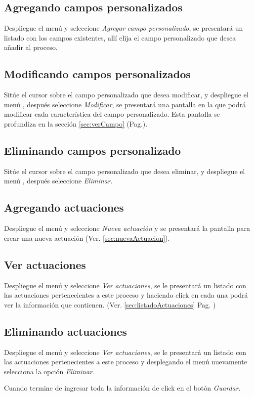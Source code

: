 \subsection{Agregando campos personalizados}
\label{sec:agregarCamposProceso}
Despliegue el men\'u \blackberry y seleccione \emph{Agregar campo personalizado}, se
presentar\'a un listado con los campos existentes, all\'i elija el campo
personalizado que desea a\~nadir al proceso.

\subsection{Modificando campos personalizados}
\label{sec:modificarCamposProceso}
Sit\'ue el cursor sobre el campo personalizado que desea modificar, y despliegue el
men\'u \blackberry, despu\'es seleccione \emph{Modificar},
se presentar\'a una pantalla en la que podr\'a modificar cada caracter\'istica
del campo personalizado. Esta pantalla se profundiza en la secci\'on
\ref{sec:verCampo} (Pag.\pageref{sec:verCampo}).

\subsection{Eliminando campos personalizado}
\label{sec:eliminarCamposProceso}
Sit\'ue el cursor sobre el campo personalizado que desea eliminar, y despliegue el
men\'u \blackberry, despu\'es seleccione \emph{Eliminar}.

\subsection{Agregando actuaciones}
\label{sec:agregarActuacionesProceso}
Despliegue el men\'u \blackberry y seleccione \emph{Nueva actuaci\'on} y se
presentar\'a la pantalla para crear una nueva actuaci\'on (Ver.
\ref{sec:nuevaActuacion}).

\subsection{Ver actuaciones}
\label{sec:verActuacionesProceso}
Despliegue el men\'u \blackberry y seleccione \emph{Ver actuaciones}, se le
presentar\'a un listado con las actuaciones pertenecientes a este proceso y
haciendo click en cada una podr\'a ver la informaci\'on que contienen. (Ver.
\ref{sec:listadoActuaciones} Pag. \pageref{sec:listadoActuaciones})

\subsection{Eliminando actuaciones}
\label{sec:eliminarActuacionesProceso}
Despliegue el men\'u \blackberry y seleccione \emph{Ver actuaciones}, se le
presentar\'a un listado con las actuaciones pertenecientes a este proceso y
desplegando el men\'u \blackberry nuevamente selecciona la opci\'on
\emph{Eliminar}.

Cuando termine de ingresar toda la informaci\'on de click en el bot\'on \emph{Guardar}.

